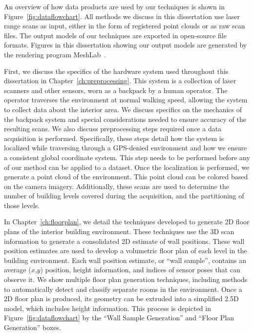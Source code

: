 \documentclass[12pt,onecolumn,oneside]{book}
\begin{document}
An overview of how data products are used by our techniques is shown in Figure~\ref{fig:dataflowchart}.  All methods we discuss in this dissertation use laser range scans as input, either in the form of registered point clouds or as raw scan files.  The output models of our techniques are exported in open-source file formats.  Figures in this dissertation showing our output models are generated by the rendering program MeshLab~\cite{Meshlab}.

First, we discuss the specifics of the hardware system used throughout this dissertation in Chapter~\ref{ch:preprocessing}.  This system is a collection of laser scanners and other sensors, worn as a backpack by a human operator.  The operator traverses the environment at normal walking speed, allowing the system to collect data about the interior area.  We discuss specifics on the mechanics of the backpack system and special considerations needed to ensure accuracy of the resulting scans.  We also discuss preprocessing steps required once a data acquisition is performed.  Specifically, these steps detail how the system is localized while traversing through a GPS-denied environment and how we ensure a consistent global coordinate system.  This step needs to be performed before any of our method can be applied to a dataset.  Once the localization is performed, we generate a point cloud of the environment.  This point cloud can be colored based on the camera imagery.  Additionally, these scans are used to determine the number of building levels covered during the acquisition, and the partitioning of those levels.

In Chapter~\ref{ch:floorplan}, we detail the techniques developed to generate 2D floor plans of the interior building environment.  These techniques use the 3D scan information to generate a consolidated 2D estimate of wall positions.  These wall position estimates are used to develop a volumetric floor plan of each level in the building environment.  Each wall position estimate, or ``wall sample'', contains an average ($x$,$y$) position, height information, and indices of sensor poses that can observe it.  We show multiple floor plan generation techniques, including methods to automatically detect and classify separate rooms in the environment.  Once a 2D floor plan is produced, its geometry can be extruded into a simplified 2.5D model, which includes height information.  This process is depicted in Figure~\ref{fig:dataflowchart} by the ``Wall Sample Generation'' and ``Floor Plan Generation'' boxes.
\end{document}
